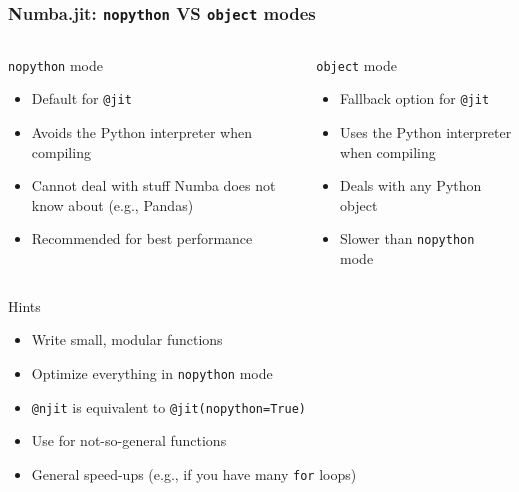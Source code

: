 \documentclass[10pt, aspectratio=1610]{beamer}
\begin{document}
\begin{frame}[fragile]
  \frametitle{Numba.jit: \texttt{nopython} VS \texttt{object} modes}

  \begin{columns}[T]
    \begin{column}{0.45\textwidth}
      \alert{\texttt{nopython}} mode
      \begin{itemize}\small
        \item Default for \lstinline{@jit}
        \item Avoids the Python interpreter when compiling
        \item Cannot deal with stuff Numba does not know about (e.g., Pandas)
        \item Recommended for best performance
      \end{itemize}
    \end{column}
    \begin{column}{0.45\textwidth}
      \alert{\texttt{object}} mode
      \begin{itemize}\small
        \item Fallback option for \lstinline{@jit}
        \item Uses the Python interpreter when compiling
        \item Deals with any Python object
        \item Slower than \texttt{nopython} mode
      \end{itemize}
    \end{column}
  \end{columns}

  \vfill

  Hints
  \begin{itemize}
    \item Write small, modular functions
    \item Optimize everything in \alert{\texttt{nopython}} mode
    \item \lstinline{@njit} is equivalent to \lstinline{@jit(nopython=True)}
    \item Use for not-so-general functions
    \item General speed-ups (e.g., if you have many \texttt{for} loops)
  \end{itemize}

\end{frame}
\end{document}
